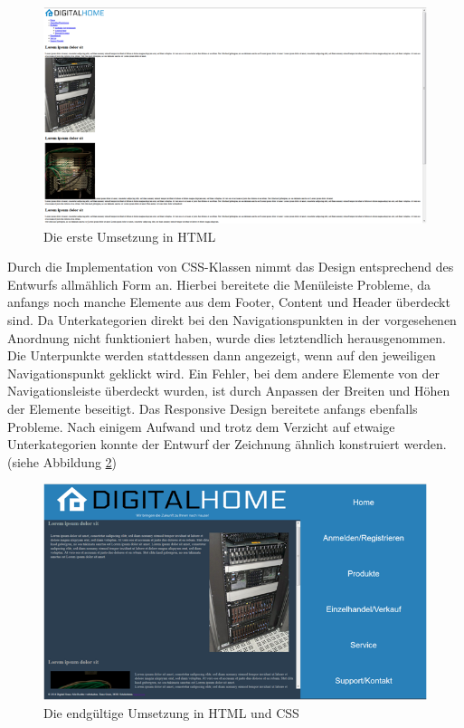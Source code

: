\begin{figure} [hp]
	\includegraphics[width=\textwidth]{./img/mini_comp2.png}
	\caption{Die erste Umsetzung in HTML}
	\label{mini_comp2}
\end{figure}

Durch die Implementation von CSS-Klassen nimmt das Design entsprechend des Entwurfs allmählich Form an. Hierbei bereitete die Menüleiste Probleme, da anfangs noch manche Elemente aus dem Footer, Content und Header überdeckt sind. Da Unterkategorien direkt bei den Navigationspunkten in der vorgesehenen Anordnung nicht funktioniert haben, wurde dies letztendlich herausgenommen. Die Unterpunkte werden stattdessen dann angezeigt, wenn auf den jeweiligen Navigationspunkt geklickt wird. Ein Fehler, bei dem andere Elemente von der Navigationsleiste überdeckt wurden, ist durch Anpassen der Breiten und Höhen der Elemente beseitigt.
Das Responsive Design bereitete anfangs ebenfalls Probleme. Nach einigem Aufwand und trotz dem Verzicht auf etwaige Unterkategorien konnte der Entwurf der Zeichnung ähnlich konstruiert werden. (siehe Abbildung \ref{mini_comp3})

\begin{figure} [hp]
	\includegraphics[width=\textwidth]{./img/mini_comp3.png}
	\caption{Die endgültige Umsetzung in HTML und CSS}
	\label{mini_comp3}
\end{figure}

